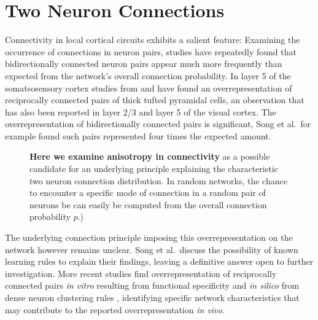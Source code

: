 \newpage

\section{Two Neuron Connections}


Connectivity in local cortical circuits exhibits a salient feature:
Examining the occurrence of connections in neuron pairs, studies have
repeatedly found that bidirectionally connected neuron pairs appear
much more frequently than expected from the network's overall
connection probability. In layer 5 of the somatsosensory cortex
studies from \textcite{Markram1997_TL5} and \textcite{Perin2011} have
found an overrepresentation of reciprocally connected pairs of thick
tufted pyramidal cells, an observation that has also been reported in
layer 2/3 \parencite{Holmgren2003} and layer 5 \parencite{Song2005} of
the visual cortex. The overrepresentation of bidirectionally connected
pairs is significant, Song et al.~for example found such pairs
represented four times the expected amount.

\begin{figure}[htp]
  \centering
  \vspace{-0.15cm}
  \caption{\textbf{Here we examine anisotropy in connectivity} as a
    possible candidate for an underlying principle explaining the
    characteristic two neuron connection distribution. In random
    networks, the chance to encounter a specific mode of connection in
    a random pair of neurons be can easily be computed from the
    overall connection probability $p$.)} %
  \label{fig:determine_side_length}
\end{figure}

The underlying connection principle imposing this overrepresentation
on the network however remains unclear. Song et al.~discuss the
possibility of known learning rules to explain their findings, leaving
a definitive answer open to further investigation. More recent studies
find overrepresentation of reciprocally connected pairs \textit{in
  vitro} resulting from functional specificity \parencite{Ko2011} and
\textit{in silico} from dense neuron clustering
rules \parencite{Klinshov2014}, identifying specific network
characteristics that may contribute to the reported overrepresentation
\textit{in vivo}. 

